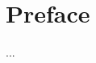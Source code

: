\thispagestyle{emptycomplete}
\chapter{Preface}

...

\vspace{0.5cm}
\hfill
\begin{flushleft}
    \noindent \\
\end{flushleft}
\newpage
